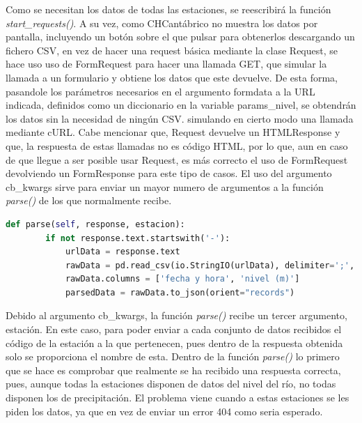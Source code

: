 Como se necesitan los datos de todas las estaciones, se reescribirá la función \textit{start\_requests()}.\newline
\newline
A su vez, como CHCantábrico no muestra los datos por pantalla, incluyendo un botón sobre el que pulsar para obtenerlos descargando un fichero CSV, en vez de hacer una request básica mediante la clase Request, se hace uso uso de FormRequest para hacer una llamada GET, que simular la llamada a un formulario y obtiene los datos que este devuelve.\newline
\newline
De esta forma, pasandole los parámetros necesarios en el argumento formdata a la URL indicada, definidos como un diccionario en la variable params\_nivel, se obtendrán los datos sin la necesidad de ningún CSV. simulando en cierto modo una llamada mediante cURL.\newline
\newline
Cabe mencionar que, Request devuelve un HTMLResponse y que, la respuesta de estas llamadas no es código HTML, por lo que, aun en caso de que llegue a ser posible usar Request, es más correcto el uso de FormRequest devolviendo un FormResponse para este tipo de casos.\newline
\newline
El uso del argumento cb\_kwargs sirve para enviar un mayor numero de argumentos a la función \textit{parse()} de los que normalmente recibe.

\begin{lstlisting}[language=Python, caption={Función \textit{parse()} CHCantábrico Nivel Spider}]
	def parse(self, response, estacion):
		if not response.text.startswith('-'):
			urlData = response.text
			rawData = pd.read_csv(io.StringIO(urlData), delimiter=';', encoding='utf-8', header=1)
			rawData.columns = ['fecha y hora', 'nivel (m)']
			parsedData = rawData.to_json(orient="records")
\end{lstlisting}

Debido al argumento cb\_kwargs, la función \textit{parse()} recibe un tercer argumento, estación. En este caso, para poder enviar a cada conjunto de datos recibidos el código de la estación a la que pertenecen, pues dentro de la respuesta obtenida solo se proporciona el nombre de esta.\newline
\newline
Dentro de la función \textit{parse()} lo primero que se hace es comprobar que realmente se ha recibido una respuesta correcta, pues, aunque todas la estaciones disponen de datos del nivel del río, no todas disponen los de precipitación. El problema viene cuando a estas estaciones se les piden los datos, ya que en vez de enviar un error 404 como seria esperado.

